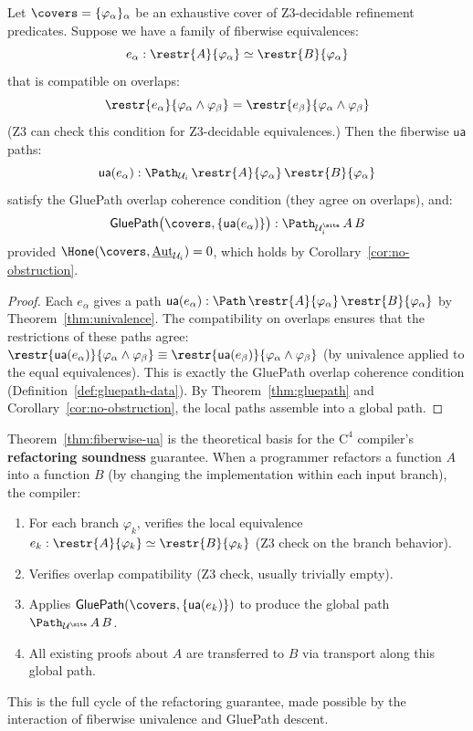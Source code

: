 \begin{theorem}
\label{thm:fiberwise-ua}
Let $\covers = \{\varphi_\alpha\}_\alpha$ be an exhaustive cover of
Z3-decidable refinement predicates.  Suppose we have a family of
fiberwise equivalences:
\[
  e_\alpha : \restr{A}{\varphi_\alpha} \simeq \restr{B}{\varphi_\alpha}
\]
that is compatible on overlaps:
\[
  \restr{e_\alpha}{\varphi_\alpha \wedge \varphi_\beta}
  = \restr{e_\beta}{\varphi_\alpha \wedge \varphi_\beta}
\]
(Z3 can check this condition for Z3-decidable equivalences.)
Then the fiberwise $\mathsf{ua}$ paths:
\[
  \mathsf{ua}(e_\alpha) : \Path_{\mathcal{U}_i}\,
  \restr{A}{\varphi_\alpha}\, \restr{B}{\varphi_\alpha}
\]
satisfy the GluePath overlap coherence condition (they agree on overlaps),
and:
\[
  \mathsf{GluePath}\bigl(\covers, \{\mathsf{ua}(e_\alpha)\}\bigr)
  : \Path_{\mathcal{U}_i^{\site}}\, A\, B
\]
provided $\Hone(\covers, \underline{\mathrm{Aut}}_{\mathcal{U}_i}) = 0$,
which holds by Corollary~\ref{cor:no-obstruction}.
\end{theorem}

\begin{proof}
Each $e_\alpha$ gives a path $\mathsf{ua}(e_\alpha) :
\Path\, \restr{A}{\varphi_\alpha}\, \restr{B}{\varphi_\alpha}$ by
Theorem~\ref{thm:univalence}.  The compatibility on overlaps ensures
that the restrictions of these paths agree:
$\restr{\mathsf{ua}(e_\alpha)}{\varphi_\alpha \wedge \varphi_\beta}
\equiv \restr{\mathsf{ua}(e_\beta)}{\varphi_\alpha \wedge \varphi_\beta}$
(by univalence applied to the equal equivalences).  This is exactly the
GluePath overlap coherence condition (Definition~\ref{def:gluepath-data}).
By Theorem~\ref{thm:gluepath} and Corollary~\ref{cor:no-obstruction}, the
local paths assemble into a global path.
\end{proof}

\begin{remark}
Theorem~\ref{thm:fiberwise-ua} is the theoretical basis for the $\mathrm{C}^4$
compiler's \textbf{refactoring soundness} guarantee.  When a programmer
refactors a function $A$ into a function $B$ (by changing the implementation
within each input branch), the compiler:
\begin{enumerate}
\item For each branch $\varphi_k$, verifies the local equivalence
  $e_k : \restr{A}{\varphi_k} \simeq \restr{B}{\varphi_k}$
  (Z3 check on the branch behavior).
\item Verifies overlap compatibility (Z3 check, usually trivially empty).
\item Applies $\mathsf{GluePath}(\covers, \{\mathsf{ua}(e_k)\})$ to produce
  the global path $\Path_{\mathcal{U}^\site}\, A\, B$.
\item All existing proofs about $A$ are transferred to $B$ via transport
  along this global path.
\end{enumerate}
This is the full cycle of the refactoring guarantee, made possible by
the interaction of fiberwise univalence and GluePath descent.
\end{remark}

